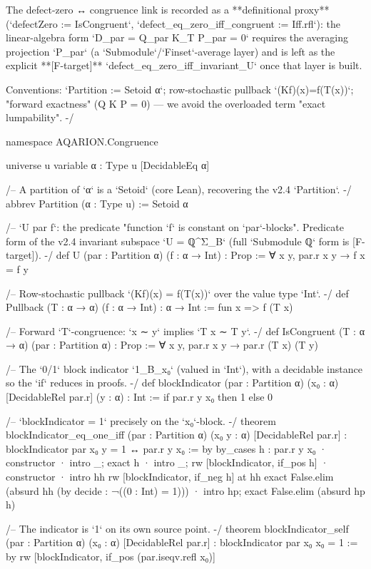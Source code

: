 The defect-zero ↔ congruence link is recorded as a **definitional proxy**
(`defectZero := IsCongruent`, `defect_eq_zero_iff_congruent := Iff.rfl`): the
linear-algebra form `D_par = Q_par K_T P_par = 0` requires the averaging projection
`P_par` (a `Submodule`/`Finset`-average layer) and is left as the explicit
**[F-target]** `defect_eq_zero_iff_invariant_U` once that layer is built.

Conventions: `Partition := Setoid α`; row-stochastic pullback `(Kf)(x)=f(T(x))`;
"forward exactness" (Q K P = 0) — we avoid the overloaded term "exact lumpability".
-/

namespace AQARION.Congruence

universe u
variable {α : Type u} [DecidableEq α]

/-- A partition of `α` is a `Setoid` (core Lean), recovering the v2.4 `Partition`. -/
abbrev Partition (α : Type u) := Setoid α

/-- `U par f`: the predicate "function `f` is constant on `par`-blocks". Predicate
    form of the v2.4 invariant subspace `U = ℚ^{Σ_B}` (full `Submodule ℚ` form is
    [F-target]). -/
def U (par : Partition α) (f : α → Int) : Prop := ∀ x y, par.r x y → f x = f y

/-- Row-stochastic pullback `(Kf)(x) = f(T(x))` over the value type `Int`. -/
def Pullback (T : α → α) (f : α → Int) : α → Int := fun x => f (T x)

/-- Forward `T`-congruence: `x ∼ y` implies `T x ∼ T y`. -/
def IsCongruent (T : α → α) (par : Partition α) : Prop :=
  ∀ x y, par.r x y → par.r (T x) (T y)

/-- The `0/1` block indicator `1_{B_{x₀}}` (valued in `Int`), with a decidable
    instance so the `if` reduces in proofs. -/
def blockIndicator (par : Partition α) (x₀ : α) [DecidableRel par.r] (y : α) : Int :=
  if par.r y x₀ then 1 else 0

/-- `blockIndicator = 1` precisely on the `x₀`-block. -/
theorem blockIndicator_eq_one_iff (par : Partition α) (x₀ y : α) [DecidableRel par.r] :
    blockIndicator par x₀ y = 1 ↔ par.r y x₀ := by
  by_cases h : par.r y x₀
  · constructor
    · intro _; exact h
    · intro _; rw [blockIndicator, if_pos h]
  · constructor
    · intro hh
      rw [blockIndicator, if_neg h] at hh
      exact False.elim (absurd hh (by decide : ¬((0 : Int) = 1)))
    · intro hp; exact False.elim (absurd hp h)

/-- The indicator is `1` on its own source point. -/
theorem blockIndicator_self (par : Partition α) (x₀ : α) [DecidableRel par.r] :
    blockIndicator par x₀ x₀ = 1 := by
  rw [blockIndicator, if_pos (par.iseqv.refl x₀)]

